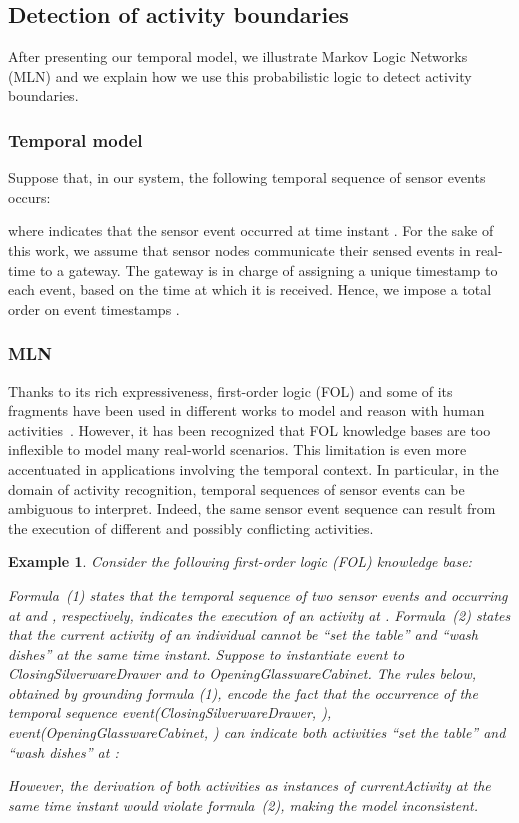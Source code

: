 \documentclass[10pt, conference, compsocconf]{IEEEtran}
\newtheorem{example}{Example}
\begin{document}
\subsection{Detection of activity boundaries}
After presenting our temporal model, we illustrate Markov Logic Networks (MLN)
and we explain how we use this probabilistic logic to detect activity boundaries. 

\subsubsection{Temporal model}
Suppose that, in our system, the following temporal sequence of sensor events occurs: 

where  indicates that the sensor event  occurred at time instant . 
For the sake of this work, we assume that sensor nodes communicate their sensed events in 
real-time to a gateway. The gateway is in charge of assigning a unique timestamp to each event, 
based on the time at which it is received. 
Hence, we impose a total order on event timestamps . 


\subsubsection{MLN}
\label{subsec:mln}
Thanks to its rich expressiveness, first-order logic (FOL) and some of its fragments have been used in different works to model and reason with human activities~\cite{RiboniPMC11}. However, it has been recognized that FOL knowledge bases are too inflexible to model many real-world scenarios. This limitation is even more accentuated in applications involving the temporal context. In particular, in the domain of activity recognition, temporal sequences of sensor events can be ambiguous to interpret. Indeed, the same sensor event sequence can result from the execution of different and possibly conflicting activities. 

\begin{example}
\label{ex:act}
Consider the following first-order logic (FOL) knowledge base:

Formula~(1) states that the temporal sequence of two sensor events  and  occurring at 
and , respectively, indicates the execution of an activity  at . 
Formula~(2) states that the current activity of an individual cannot be ``set the table''
and ``wash dishes'' at the same time instant.
Suppose to instantiate event  to \emph{ClosingSilverwareDrawer} and  to 
\emph{OpeningGlasswareCabinet}. 
The rules below, obtained by grounding formula (1), encode the fact that the occurrence 
of the temporal sequence  \emph{event(ClosingSilverwareDrawer, )}, 
\emph{event(OpeningGlasswareCabinet, )}  can indicate both activities 
``set the table'' and ``wash dishes'' at :

However, the derivation of both activities as instances of \emph{currentActivity} at the same 
time instant  would violate formula~(2), making the model inconsistent. 
\end{example}
\end{document}
